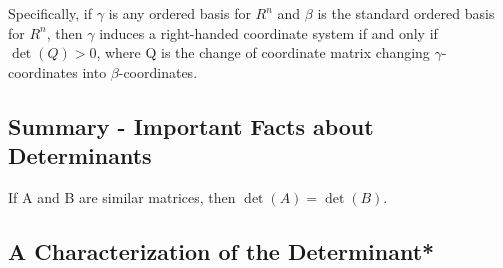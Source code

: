 \documentclass{article}
\theoremstyle{plain}
\theoremstyle{plain} %
\begin{document}
Specifically, if $\gamma$ is any ordered basis for $R^n$ and $\beta$ is the standard ordered basis for $R^n$, then $\gamma$ induces a right-handed coordinate system if and only if $\det(Q) > 0$, where Q is the change of coordinate matrix changing $\gamma$-coordinates into $\beta$-coordinates.

\subsection{Summary - Important Facts about Determinants}

If A and B are similar matrices, then $\det(A) = \det(B)$.

\subsection{A Characterization of the Determinant*}
\end{document}
